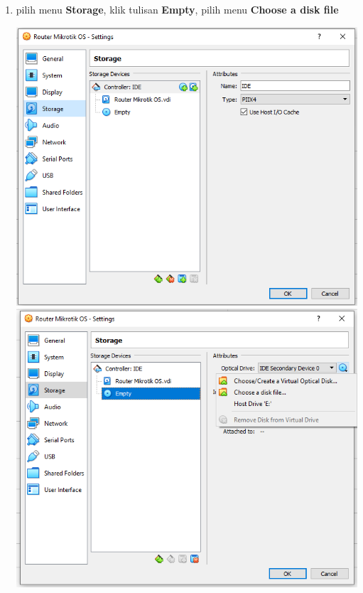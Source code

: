\documentclass{article}
\begin{document}
\begin{flushleft}
\begin{enumerate}
			\item pilih menu \textbf{Storage}, klik tulisan \textbf{Empty}, pilih menu \textbf{Choose a disk file}
				\begin{center}
					\includegraphics[scale=0.6]{(b)}
					\includegraphics[scale=0.6]{(c)} 
				\end{center}
				

\end{enumerate}
\end{flushleft}
\end{document}
